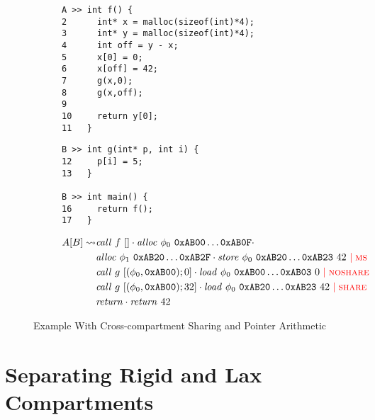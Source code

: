 \documentclass{article}
\begin{document}
\begin{figure}
  \begin{subfigure}{\textwidth}
    \begin{minipage}[t]{0.5\textwidth}
\begin{verbatim}
A >> int f() {
2      int* x = malloc(sizeof(int)*4);
3      int* y = malloc(sizeof(int)*4);
4      int off = y - x;
5      x[0] = 0;
6      x[off] = 42;
7      g(x,0);
8      g(x,off);
9
10     return y[0];
11   }
\end{verbatim}
    \end{minipage}
    \begin{minipage}[t]{0.4\textwidth}
\begin{verbatim}
B >> int g(int* p, int i) {
12     p[i] = 5;
13   }

B >> int main() {
16     return f();
17   }
\end{verbatim}
    \end{minipage}
  \end{subfigure}
  \begin{subfigure}{\textwidth}
    \[\begin{split}
    A[B] \rightsquigarrow & \mathit{call} ~ f ~ [] \cdot
    \mathit{alloc} ~ \phi_0 ~ \mathtt{0xAB00} \dots \mathtt{0xAB0F} \cdot \\
    & \mathit{alloc} ~ \phi_1 ~ \mathtt{0xAB20} \dots \mathtt{0xAB2F} \cdot
    \mathit{store} ~ \phi_0 ~ \mathtt{0xAB20} \dots \mathtt{0xAB23} ~ 42 ~
           {\color{red} \mid \textnormal{\sc ms}} \\
    & \mathit{call} ~ g ~ [(\phi_0, \mathtt{0xAB00}); 0] \cdot
    \mathit{load} ~ \phi_0 ~ \mathtt{0xAB00} \dots \mathtt{0xAB03} ~ 0 ~
           {\color{red} \mid \textnormal{\sc noshare}} \\
    & \mathit{call} ~ g ~ [(\phi_0, \mathtt{0xAB00}); 32] \cdot
    \mathit{load} ~ \phi_0 ~ \mathtt{0xAB20} \dots \mathtt{0xAB23} ~ 42 ~
           {\color{red} \mid \textnormal{\sc share}} \\
    & \mathit{return} \cdot \mathit{return} ~ 42 \\
    \end{split}\]
  \end{subfigure}
  
  \caption{Example With Cross-compartment Sharing and Pointer Arithmetic}
  \label{fig:sharingexample}
\end{figure}



\section{Separating Rigid and Lax Compartments}
\end{document}
